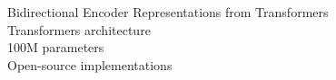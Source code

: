 \documentclass[preview]{standalone}
\begin{document}
Bidirectional Encoder Representations from Transformers\\Transformers architecture\\100M parameters\\Open-source implementations\\
\end{document}
